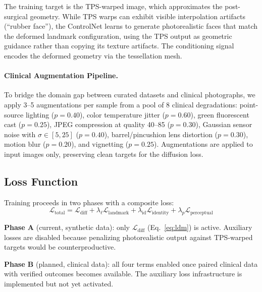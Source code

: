 \documentclass[runningheads]{llncs}
\begin{document}
The training target is the TPS-warped image, which approximates the
post-surgical geometry.  While TPS warps can exhibit visible
interpolation artifacts (``rubber face''), the ControlNet learns to
generate photorealistic faces that match the deformed landmark
configuration, using the TPS output as geometric guidance rather than
copying its texture artifacts.  The conditioning signal encodes the
deformed geometry via the tessellation mesh.

\paragraph{Clinical Augmentation Pipeline.}
To bridge the domain gap between curated datasets and clinical photographs,
we apply 3–5 augmentations per sample from a pool of 8 clinical
degradations: point-source lighting ($p=0.40$), color temperature jitter
($p=0.60$), green fluorescent cast ($p=0.25$), JPEG compression at
quality 40–85 ($p=0.30$), Gaussian sensor noise with $\sigma \in [5,25]$
($p=0.40$), barrel/pincushion lens distortion ($p=0.30$), motion blur
($p=0.20$), and vignetting ($p=0.25$).  Augmentations are applied to
input images only, preserving clean targets for the diffusion loss.

\subsection{Loss Function}
\label{sec:loss}

Training proceeds in two phases with a composite loss:
\begin{equation}
\label{eq:loss}
\mathcal{L}_\text{total} = \mathcal{L}_\text{diff}
+ \lambda_\ell \mathcal{L}_\text{landmark}
+ \lambda_\text{id} \mathcal{L}_\text{identity}
+ \lambda_p \mathcal{L}_\text{perceptual}
\end{equation}

\textbf{Phase A} (current, synthetic data): only $\mathcal{L}_\text{diff}$
(Eq.~\ref{eq:ldm}) is active.  Auxiliary losses are disabled because
penalizing photorealistic output against TPS-warped targets would be
counterproductive.

\textbf{Phase B} (planned, clinical data): all four terms enabled once
paired clinical data with verified outcomes becomes available.  The
auxiliary loss infrastructure is implemented but not yet activated.
\end{document}
